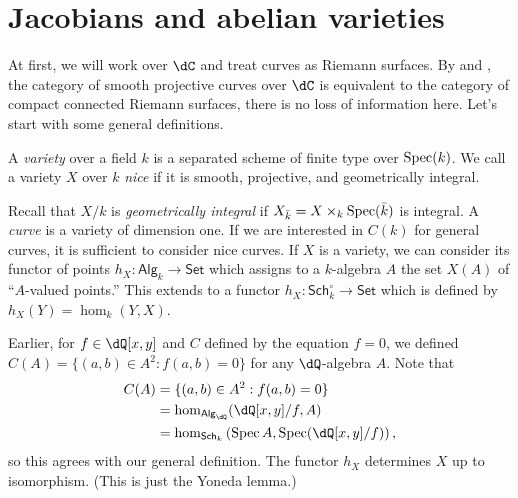 






\section{Jacobians and abelian varieties}


At first, we will work over $\dC$ and treat curves as Riemann surfaces. By 
\cite[I.6.12]{ha77} and \cite[5.8.7]{jo06}, 
the category of smooth projective curves over $\dC$ is equivalent to the 
category of compact connected Riemann surfaces, there is no loss of 
information here. Let's start with some general definitions.

\begin{definition}
A \emph{variety} over a field $k$ is a separated scheme of finite type over 
$\operatorname{Spec}(k)$. We call a variety $X$ over $k$ \emph{nice} if it is smooth, projective, 
and geometrically integral.
\end{definition}

Recall that $X/k$ is \emph{geometrically integral} if 
$X_{\bar k}=X\times_k \operatorname{Spec}(\bar k)$ is integral. A \emph{curve} is a 
variety of dimension one. If we are interested in $C(k)$ for general curves, 
it is sufficient to consider nice curves. If $X$ is a variety, we can consider 
its functor of points $h_X:\mathsf{Alg}_k\to \mathsf{Set}$ which assigns to a 
$k$-algebra $A$ the set $X(A)$ of ``$A$-valued points.'' This extends to a 
functor $h_X:\mathsf{Sch}_k^\circ\to\mathsf{Set}$ which is defined by 
$h_X(Y)=\hom_k(Y,X)$. 

Earlier, for $f\in \dQ[x,y]$ and $C$ defined by the equation $f=0$, we 
defined $C(A)=\{(a,b)\in A^2:f(a,b)=0\}$ for any $\dQ$-algebra $A$. 
Note that 
\begin{align*}
  C(A) &= \{(a,b)\in A^2:f(a,b) = 0\} \\
    &= \hom_{\mathsf{Alg}_\dQ}(\dQ[x,y]/f,A) \\
    &= \hom_{\mathsf{Sch}_k}\left(\spec A,\spec(\dQ[x,y]/f)\right) \text{,}
\end{align*}
so this agrees with our general definition. The functor $h_X$ determines $X$ 
up to isomorphism. (This is just the Yoneda lemma.)






